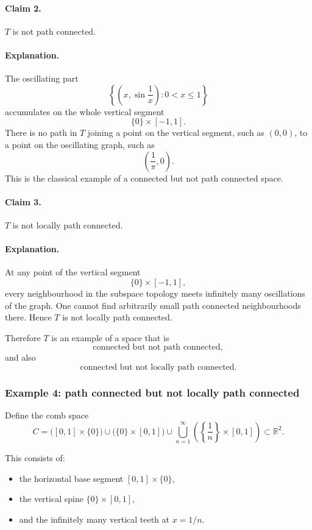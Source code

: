\documentclass[12pt,a4paper]{article}
\theoremstyle{notespace}
\begin{document}
\paragraph{Claim 2.}
\(T\) is not path connected.

\paragraph{Explanation.}
The oscillating part
\[
\left\{
\left(x,\sin\frac{1}{x}\right):0<x\leq 1
\right\}
\]
accumulates on the whole vertical segment
\[
\{0\}\times[-1,1].
\]
There is no path in \(T\) joining a point on the vertical segment, such as \((0,0)\), to a point on the oscillating graph, such as
\[
\left(\frac{1}{\pi},0\right).
\]
This is the classical example of a connected but not path connected space.

\paragraph{Claim 3.}
\(T\) is not locally path connected.

\paragraph{Explanation.}
At any point of the vertical segment
\[
\{0\}\times[-1,1],
\]
every neighbourhood in the subspace topology meets infinitely many oscillations of the graph. One cannot find arbitrarily small path connected neighbourhoods there. Hence \(T\) is not locally path connected.

Therefore \(T\) is an example of a space that is
\[
\text{connected but not path connected},
\]
and also
\[
\text{connected but not locally path connected}.
\]

\subsubsection{Example 4: path connected but not locally path connected}

Define the comb space
\[
C=
\bigl([0,1]\times\{0\}\bigr)
\cup
\bigl(\{0\}\times[0,1]\bigr)
\cup
\bigcup_{n=1}^{\infty}
\left(
\left\{\frac{1}{n}\right\}\times[0,1]
\right)
\subset \mathbb{R}^2.
\]

This consists of:
\begin{itemize}
	\item the horizontal base segment \([0,1]\times\{0\}\),
	\item the vertical spine \(\{0\}\times[0,1]\),
	\item and the infinitely many vertical teeth at \(x=1/n\).
\end{itemize}
\end{document}
